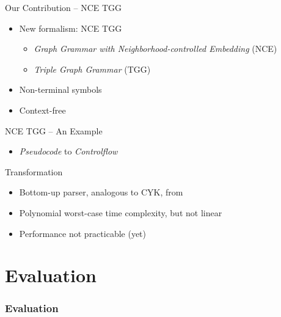 \documentclass[usenames,dvipsnames]{beamer}
\begin{document}
	\begin{frame}{Our Contribution -- NCE TGG}
		\begin{itemize}
			\item New formalism: NCE TGG
			\begin{itemize}
				\item \emph{Graph Grammar with Neighborhood-controlled Embedding} (NCE) \cite{janssens1982graph}
				\item \emph{Triple Graph Grammar} (TGG) \cite{schurr1994specification}
			\end{itemize}
			\item Non-terminal symbols
			\item Context-free
		\end{itemize}
	\end{frame}
	
	\begin{frame}{NCE TGG -- An Example}
		\begin{itemize}
			\item \emph{Pseudocode} to \emph{Controlflow}
		\end{itemize}
		
		
	\end{frame}
	
	\begin{frame}{Transformation}
		\begin{itemize}
			\item Bottom-up parser, analogous to CYK, from \cite{rozenberg1986boundary}
			\item Polynomial worst-case time complexity, but not linear
			\item Performance not practicable (yet)
		\end{itemize}
	\end{frame}
	
	\section{Evaluation}
	\begin{frame}
		\frametitle{Evaluation}
	\end{frame}
	
\end{document}
